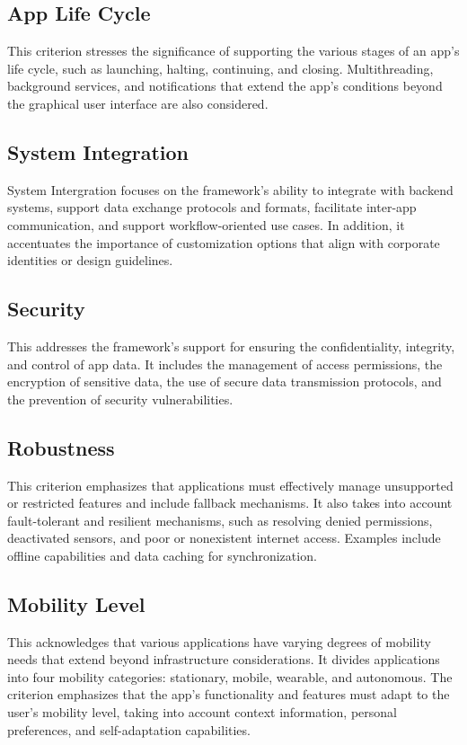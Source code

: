 \subsection{App Life Cycle}
This criterion stresses the significance of supporting the various stages of an app's life cycle, such as launching, halting, continuing, and closing. Multithreading, background services, and notifications that extend the app's conditions beyond the graphical user interface are also considered.

\subsection{System Integration}
System Intergration focuses on the framework's ability to integrate with backend systems, support data exchange protocols and formats, facilitate inter-app communication, and support workflow-oriented use cases. In addition, it accentuates the importance of customization options that align with corporate identities or design guidelines.

\subsection{Security}
This addresses the framework's support for ensuring the confidentiality, integrity, and control of app data. It includes the management of access permissions, the encryption of sensitive data, the use of secure data transmission protocols, and the prevention of security vulnerabilities.

\subsection{Robustness}
This criterion emphasizes that applications must effectively manage unsupported or restricted features and include fallback mechanisms. It also takes into account fault-tolerant and resilient mechanisms, such as resolving denied permissions, deactivated sensors, and poor or nonexistent internet access. Examples include offline capabilities and data caching for synchronization.

\subsection{Mobility Level}
This acknowledges that various applications have varying degrees of mobility needs that extend beyond infrastructure considerations. It divides applications into four mobility categories: stationary, mobile, wearable, and autonomous. The criterion emphasizes that the app's functionality and features must adapt to the user's mobility level, taking into account context information, personal preferences, and self-adaptation capabilities.

